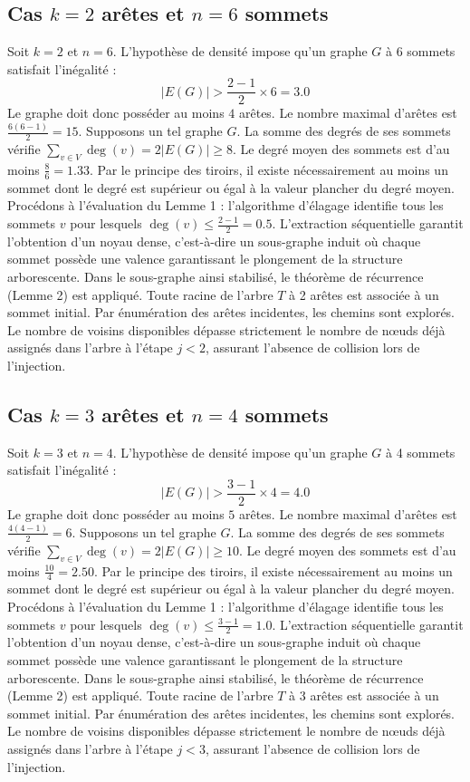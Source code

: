\documentclass[12pt,a4paper]{article}
\begin{document}
\subsection{Cas $k = 2$ arêtes et $n = 6$ sommets}
Soit $k = 2$ et $n = 6$. L'hypothèse de densité impose qu'un graphe $G$ à 6 sommets satisfait l'inégalité :
$$ |E(G)| > \frac{2-1}{2} \times 6 = 3.0 $$
Le graphe doit donc posséder au moins $4$ arêtes. Le nombre maximal d'arêtes est $\frac{6(6-1)}{2} = 15$.
Supposons un tel graphe $G$. La somme des degrés de ses sommets vérifie $\sum_{v \in V} \deg(v) = 2|E(G)| \geq 8$.
Le degré moyen des sommets est d'au moins $\frac{8}{6} = 1.33$.
Par le principe des tiroirs, il existe nécessairement au moins un sommet dont le degré est supérieur ou égal à la valeur plancher du degré moyen.
Procédons à l'évaluation du Lemme 1 : l'algorithme d'élagage identifie tous les sommets $v$ pour lesquels $\deg(v) \leq \frac{2-1}{2} = 0.5$.
L'extraction séquentielle garantit l'obtention d'un noyau dense, c'est-à-dire un sous-graphe induit où chaque sommet possède une valence garantissant le plongement de la structure arborescente.
Dans le sous-graphe ainsi stabilisé, le théorème de récurrence (Lemme 2) est appliqué. Toute racine de l'arbre $T$ à 2 arêtes est associée à un sommet initial. Par énumération des arêtes incidentes, les chemins sont explorés. Le nombre de voisins disponibles dépasse strictement le nombre de nœuds déjà assignés dans l'arbre à l'étape $j < 2$, assurant l'absence de collision lors de l'injection.

\subsection{Cas $k = 3$ arêtes et $n = 4$ sommets}
Soit $k = 3$ et $n = 4$. L'hypothèse de densité impose qu'un graphe $G$ à 4 sommets satisfait l'inégalité :
$$ |E(G)| > \frac{3-1}{2} \times 4 = 4.0 $$
Le graphe doit donc posséder au moins $5$ arêtes. Le nombre maximal d'arêtes est $\frac{4(4-1)}{2} = 6$.
Supposons un tel graphe $G$. La somme des degrés de ses sommets vérifie $\sum_{v \in V} \deg(v) = 2|E(G)| \geq 10$.
Le degré moyen des sommets est d'au moins $\frac{10}{4} = 2.50$.
Par le principe des tiroirs, il existe nécessairement au moins un sommet dont le degré est supérieur ou égal à la valeur plancher du degré moyen.
Procédons à l'évaluation du Lemme 1 : l'algorithme d'élagage identifie tous les sommets $v$ pour lesquels $\deg(v) \leq \frac{3-1}{2} = 1.0$.
L'extraction séquentielle garantit l'obtention d'un noyau dense, c'est-à-dire un sous-graphe induit où chaque sommet possède une valence garantissant le plongement de la structure arborescente.
Dans le sous-graphe ainsi stabilisé, le théorème de récurrence (Lemme 2) est appliqué. Toute racine de l'arbre $T$ à 3 arêtes est associée à un sommet initial. Par énumération des arêtes incidentes, les chemins sont explorés. Le nombre de voisins disponibles dépasse strictement le nombre de nœuds déjà assignés dans l'arbre à l'étape $j < 3$, assurant l'absence de collision lors de l'injection.
\end{document}
